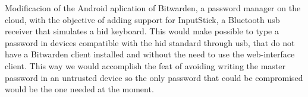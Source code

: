 Modificacion of the Android aplication of Bitwarden, a password manager on the cloud, with the objective of adding support for InputStick, a Bluetooth \gls{usb} receiver that simulates a \gls{hid} keyboard. This would make possible to type a password in devices compatible with the \gls{hid} standard through \gls{usb}, that do not have a Bitwarden client installed and without the need to use the web-interface client. This way we would accomplish the feat of avoiding writing the master password in an untrusted device so the only password that could be compromised would be the one needed at the moment.